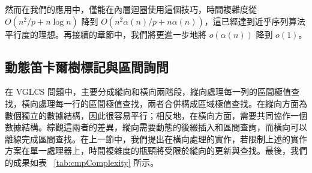 \documentclass{gapd}
\begin{document}
然而在我們的應用中，僅能在內層迴圈使用這個技巧，時間複雜度從 $O(n^2 / p + n \log n)$ 降到 $O(n^2 \alpha(n) / p + n \alpha(n))$，這已經達到近乎序列算法平行度的理想。再接續的章節中，我們將更進一步地將 $o(\alpha(n))$ 降到 $o(1)$。

\subsection{動態笛卡爾樹標記與區間詢問}

在 VGLCS 問題中，主要分成縱向和橫向兩階段，縱向處理每一列的區間極值查找，橫向處理每一行的區間極值查找，兩者合併構成區域極值查找。在縱向方面為數個獨立的數據結構，因此很容易平行；相反地，在橫向方面，需要共同協作一個數據結構。綜觀這兩者的差異，縱向需要動態的後綴插入和區間查詢，而橫向可以離線完成區間查找。在上一節中，我們提出在橫向處理的實作，若限制上述的實作方案在單一處理器上，時間複雜度的瓶頸將受限於縱向的更新與查找。最後，我們的成果如表 ~\ref{tab:cmpComplexity} 所示。
\end{document}
